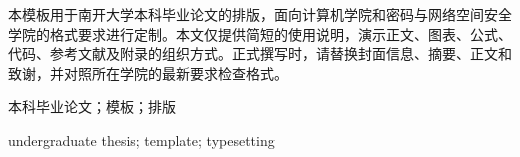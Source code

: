 \begin{zhaiyao}
\begin{spacing}{1.5}
本模板用于南开大学本科毕业论文的排版，面向计算机学院和密码与网络空间安全学院的格式要求进行定制。本文仅提供简短的使用说明，演示正文、图表、公式、代码、参考文献及附录的组织方式。正式撰写时，请替换封面信息、摘要、正文和致谢，并对照所在学院的最新要求检查格式。
\end{spacing}
\end{zhaiyao}

\begin{guanjianci}
本科毕业论文；模板；排版
\end{guanjianci}

\begin{abstract}
\begin{spacing}{1.5}
This template supports undergraduate thesis typesetting at Nankai University.
It provides a starting point for thesis writing and should be adapted to the requirements of the relevant college.
This short guide demonstrates the organization of the main text, figures, tables, equations, code, references, and appendices.
Before writing a thesis, replace the sample content and check the current requirements of the relevant college.
\end{spacing}
\end{abstract}

\begin{keywords}
undergraduate thesis; template; typesetting
\end{keywords}

